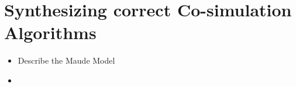 \section{Synthesizing correct Co-simulation Algorithms}\label{sc:synthesizing}

\begin{itemize}
  \item Describe the Maude Model
  \item 
\end{itemize}
